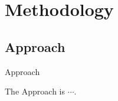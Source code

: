 \section{Methodology}\label{sec:methodology}

\subsection{Approach}\label{subsec:approach}

\begin{frame}{Approach}

    The Approach is $\cdots$.

\end{frame}
